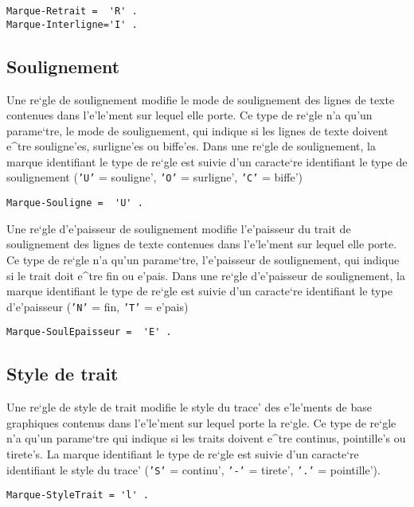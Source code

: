 \begin{verbatim}
Marque-Retrait =  'R' .
Marque-Interligne='I' .
\end{verbatim}

\subsection{Soulignement}

Une re`gle de soulignement modifie le mode de soulignement des lignes de texte
contenues dans l'e'le'ment sur lequel elle porte. Ce type de re`gle n'a qu'un
parame`tre, le mode de soulignement, qui indique si les lignes de texte doivent
e^tre souligne'es, surligne'es ou biffe'es. Dans une re`gle de soulignement, 
la marque identifiant le type de re`gle est suivie d'un caracte`re identifiant
le type de soulignement ({\tt 'U'} = souligne', {\tt 'O'} = surligne', 
{\tt 'C'} = biffe')

\begin{verbatim}
Marque-Souligne =  'U' .
\end{verbatim}

Une re`gle d'e'paisseur de soulignement modifie l'e'paisseur du trait de soulignement des lignes de texte
contenues dans l'e'le'ment sur lequel elle porte. Ce type de re`gle n'a qu'un
parame`tre, l'e'paisseur de soulignement, qui indique si le trait doit e^tre fin ou e'pais.
Dans une re`gle d'e'paisseur de soulignement, 
la marque identifiant le type de re`gle est suivie d'un caracte`re identifiant
le type d'e'paisseur ({\tt 'N'} = fin, {\tt 'T'} = e'pais) 

\begin{verbatim}
Marque-SoulEpaisseur =  'E' .
\end{verbatim}

\subsection{Style de trait}

Une re`gle de style de trait modifie le style du trace' des e'le'ments de base
graphiques contenus dans l'e'le'ment sur lequel porte la re`gle. Ce type de
re`gle n'a qu'un parame`tre qui indique si les traits doivent e^tre continus,
pointille's ou tirete's. La marque identifiant le type de re`gle est suivie
d'un caracte`re identifiant le style du trace' ({\tt 'S'} = continu',
{\tt '-'} = tirete', {\tt '.'} = pointille').

\begin{verbatim}
Marque-StyleTrait = 'l' .
\end{verbatim}


